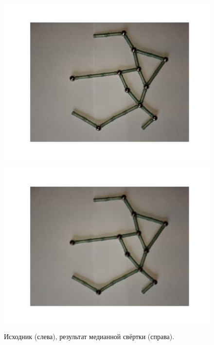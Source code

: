 \documentclass[10pt]{article}
\begin{document}
	\begin{figure}[h]
		\begin{minipage}[h]{0.4\linewidth}
			\begin{center}
				{\includegraphics[width=1.0\linewidth]{data/median_blur_start.pdf}}
			\end{center}
		\end{minipage}
		\hfill
		\begin{minipage}[h]{0.4\linewidth}
			\begin{center}
				{\includegraphics[width=1.0\linewidth]{data/median_blur.pdf}}
			\end{center}
		\end{minipage}
		
		\caption{Исходник (слева), результат медианной свёртки (справа).}
		\label{ris:image4}
	\end{figure}
	
\end{document}
